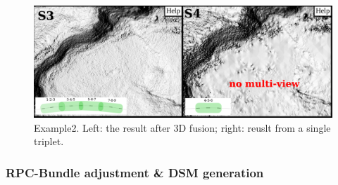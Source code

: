 %
%
\begin{figure}[!]
\centering
\includegraphics[width=0.9\linewidth]{FIGS/Satellites/fusion_res.png}
\caption{Example2. Left: the result after 3D fusion; right: reuslt from a single triplet.}
\label{fig:fus:res}
\end{figure}
%
\subsubsection*{RPC-Bundle adjustment \& DSM generation}
%
